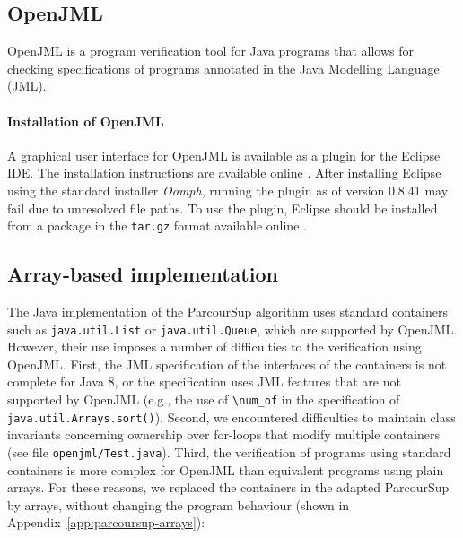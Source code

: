 \documentclass[a4paper]{report}
\newcommand{\aref}[1]{Appendix~\ref{#1}}
\begin{document}
\subsection{OpenJML}

OpenJML \cite{cok14,openjml-website} is a program verification tool for Java
programs that allows for checking specifications of programs annotated in the
Java Modelling Language (JML).

\paragraph{Installation of OpenJML}

A graphical user interface for OpenJML is available as a plugin for the Eclipse
IDE. The installation instructions are available online
\cite{openjml-installation-documentation}. After installing Eclipse using the
standard installer \emph{Oomph}, running the plugin as of version 0.8.41 may
fail due to unresolved file paths. To use the plugin, Eclipse should be
installed from a package in the \texttt{tar.gz} format available online
\cite{eclipse-installation-packages}.


\subsection{Array-based implementation}
\label{sec:parcoursup-arrays}

The Java implementation of the ParcourSup algorithm uses standard containers
such as \lstinline{java.util.List} or \lstinline{java.util.Queue}, which are
supported by OpenJML. However, their use imposes a number of difficulties to the
verification using OpenJML. First, the JML specification of the interfaces of
the containers is not complete for Java 8, or the specification uses JML
features that are not supported by OpenJML (e.g., the use of \lstinline{\num_of}
in the specification of \lstinline{java.util.Arrays.sort()}). Second, we
encountered difficulties to maintain class invariants concerning ownership over
for-loops that modify multiple containers (see file \texttt{openjml/Test.java}).
Third, the verification of programs using standard containers is more complex
for OpenJML than equivalent programs using plain arrays. For these reasons, we
replaced the containers in the adapted ParcourSup by arrays, without changing
the program behaviour (shown in \aref{app:parcoursup-arrays}):
\end{document}
